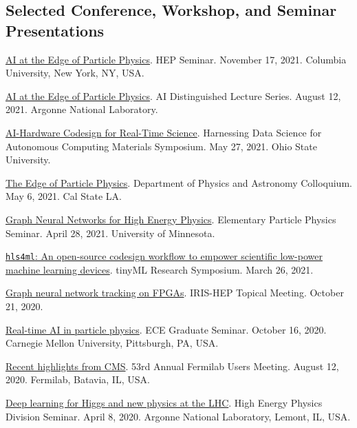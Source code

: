 \documentclass[11pt]{res}
\newcommand{\MarginText}[1]{\section{#1}\vspace{10pt}}
\begin{document}
\begin{resume}

  \MarginText{Selected Conference, Workshop, and Seminar Presentations}

  \href{https://physics.columbia.edu/events/hep-seminar-dr-javier-duarte-ucsd}{AI at the Edge of Particle Physics}. HEP Seminar. November 17, 2021. Columbia University, New York, NY, USA.

  \href{https://www.anl.gov/event/ai-at-the-edge-of-particle-physics}{AI at the Edge of Particle Physics}. AI Distinguished Lecture Series. August 12, 2021. Argonne National Laboratory.

  \href{https://tdai.osu.edu/events/acm-symposium-harnessing-data-science-autonomous-computing-materials}{AI-Hardware Codesign for Real-Time Science}. Harnessing Data Science for Autonomous Computing Materials Symposium. May 27, 2021. Ohio State University.

  \href{https://www.calstatela.edu/dept/physics/colloquia-and-events}{The Edge of Particle Physics}. Department of Physics and Astronomy Colloquium. May 6, 2021. Cal State LA.

  \href{https://cse.umn.edu/physics/elementary-particle-physics-elem-part-phys-seminar}{Graph Neural Networks for High Energy Physics}. Elementary Particle Physics Seminar. April 28, 2021. University of Minnesota.

  \href{https://www.tinyml.org/event/research-symposium-2021/}{\texttt{hls4ml}: An open-source codesign workflow to empower scientific low-power machine learning devices}. tinyML Research Symposium. March 26, 2021.

  \href{https://indico.cern.ch/event/955026/}{Graph neural network tracking on FPGAs}. IRIS-HEP Topical Meeting. October 21, 2020.

  \href{https://www.cs.cmu.edu/calendar/fri-2020-10-16-1200/ece-graduate-seminar}{Real-time AI in particle physics}. ECE Graduate Seminar. October 16, 2020. Carnegie Mellon University, Pittsburgh, PA, USA.

  \href{https://indico.fnal.gov/event/23109/contributions/193292/}{Recent highlights from CMS}. 53rd Annual Fermilab Users Meeting. August 12, 2020. Fermilab, Batavia, IL, USA.

  \href{https://indico.fnal.gov/event/22961/}{Deep learning for Higgs and new physics at the LHC}. High Energy Physics Division Seminar. April 8, 2020. Argonne National Laboratory, Lemont, IL, USA.


\end{resume}
\end{document}
